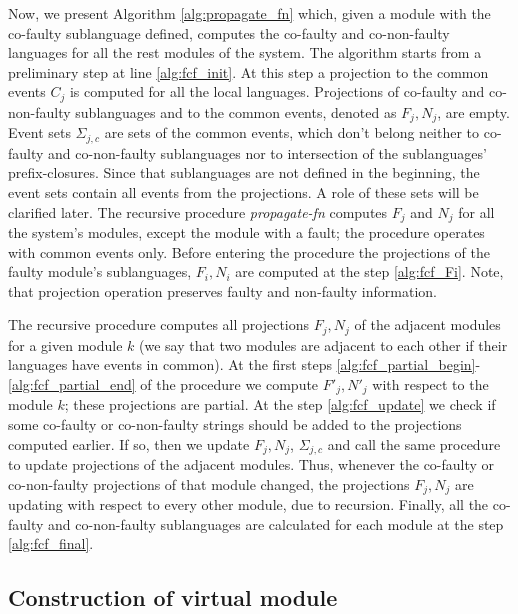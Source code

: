 \documentclass[a4paper, 10pt, conference]{ieeeconf}
\begin{document}
Now, we present Algorithm \ref{alg:propagate_fn} which, given a module with the co-faulty
sublanguage defined, computes the co-faulty and co-non-faulty languages for all
the rest modules of the system.
The algorithm starts from a preliminary step at line \ref{alg:fcf_init}.
At this step a projection to the common events $C_j$ is computed for all the
local languages. Projections of co-faulty and co-non-faulty sublanguages and
to the common events, denoted as $F_j, N_j$, are empty. Event sets
$\Sigma_{j,c}$ are sets of the common events, which don't belong neither to
co-faulty and co-non-faulty sublanguages nor to intersection of the sublanguages'
prefix-closures. Since that sublanguages are not defined in the beginning, the
event sets contain all events from the projections. A role of these sets will be
clarified later.
The recursive procedure \emph{propagate-fn} computes $F_j$ and $N_j$ for all the
system's modules, except the module with a fault; the procedure operates with
common events only. Before entering the procedure the projections of the faulty
module's sublanguages, $F_i, N_i$ are computed at the step \ref{alg:fcf_Fi}.
Note, that projection operation preserves faulty and non-faulty information.

The recursive procedure computes all projections $F_j, N_j$ of the adjacent
modules for a given module $k$ (we say that two modules are adjacent to each
other if their languages have events in common). At the first steps
\ref{alg:fcf_partial_begin}-\ref{alg:fcf_partial_end} of the
procedure we compute $F'_j, N'_j$ with respect to the module $k$; these
projections are partial. At the step \ref{alg:fcf_update} we check if some
co-faulty or co-non-faulty strings should be added to the projections computed
earlier. If so, then we update $F_j, N_j$, $\Sigma_{j,c}$ and call the same
procedure to update projections of the adjacent modules. Thus, whenever the
co-faulty or co-non-faulty projections of that module changed,
the projections $F_j, N_j$ are updating with respect to every other module, due
to recursion.
Finally, all the co-faulty and co-non-faulty sublanguages are calculated
for each module at the step \ref{alg:fcf_final}.



\subsection{Construction of  virtual module}
\end{document}
